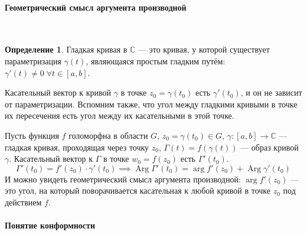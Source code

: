 \documentclass[11pt,openany,a4paper]{scrartcl}
\theoremstyle{plain}
\theoremstyle{definition}
\newtheorem{definition}[theorem]{Определение}
\newcommand\mb{\mathbb}
\newcommand{\complex}{\mb C}
\newcommand\lparagraph[1]{\paragraph{#1}\mbox{}\\}
\DeclareMathOperator{\Arg}{Arg}
\begin{document}
\lparagraph{Геометрический смысл аргумента производной}

\begin{definition}
	Гладкая кривая в $\complex$ — это кривая, у которой существует параметризация $\gamma(t)$, являющаяся простым
	гладким путём: $\gamma'(t) \neq 0\;\forall t \in [a, b]$.
\end{definition}

Касательный вектор к кривой $\gamma$ в точке $z_0 = \gamma(t_0)$ есть $\gamma'(t_0)$, и он не зависит от
параметризации. Вспомним также, что угол между гладкими кривыми в точке их пересечения есть угол между их касательными
в этой точке.

Пусть функция $f$ голоморфна в области $G$, $z_0 = \gamma(t_0) \in G$, $\gamma: [a, b] \to \complex$ — гладкая
кривая, проходящая
через точку $z_0$, $\Gamma(t) = f(\gamma(t))$ — образ кривой $\gamma$. Касательный вектор к $\Gamma$ в точке
$w_0 = f(z_0)$ есть $\Gamma'(t_0)$.
$$
\Gamma'(t_0) = f'(z_0) \cdot \gamma'(t_0) \implies \Arg \Gamma'(t_0) = \arg f'(z_0) + \Arg \gamma'(t_0)
$$
И можно увидеть геометрический смысл аргумента производной: $\arg f'(z_0)$ — это угол, на который поворачивается
касательная к любой кривой в точке $z_0$ под действием $f$.

\lparagraph{Понятие конформности}
\end{document}
